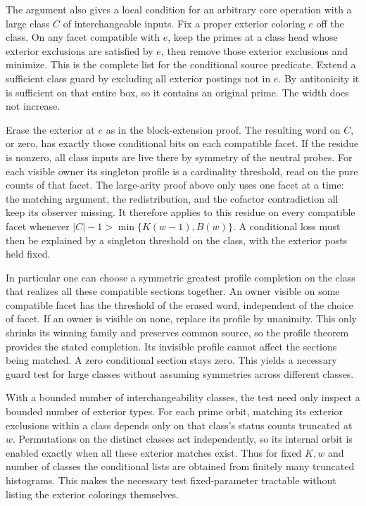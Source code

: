 The argument also gives a local condition for an arbitrary
core operation with a large class $C$ of interchangeable
inputs. Fix a proper exterior coloring $e$ off the class.
On any facet compatible with $e$, keep the primes at a class
head whose exterior exclusions are satisfied by $e$, then
remove those exterior exclusions and minimize. This is the
complete list for the conditional source predicate. Extend a
sufficient class guard by excluding all exterior postings not
in $e$. By antitonicity it is sufficient on that entire box,
so it contains an original prime. The width does not increase.

Erase the exterior at $e$ as in the block-extension proof.
The resulting word on $C$, or zero, has exactly those
conditional bits on each compatible facet. If the residue
is nonzero, all class inputs are live there by symmetry of
the neutral probes. For each visible owner its singleton
profile is a cardinality threshold, read on the pure counts
of that facet. The large-arity proof above only uses one
facet at a time: the matching argument, the redistribution,
and the cofactor contradiction all keep its observer missing.
It therefore applies to this residue on every compatible
facet whenever $|C|-1>\min\{K(w-1),B(w)\}$. A conditional
loss must then be explained by a singleton threshold on the
class, with the exterior posts held fixed.

In particular one can choose a symmetric greatest profile
completion on the class that realizes all these compatible
sections together. An owner visible on some compatible facet
has the threshold of the erased word, independent of the
choice of facet. If an owner is visible on none, replace its
profile by unanimity. This only shrinks its winning family
and preserves common source, so the profile theorem provides
the stated completion. Its invisible profile cannot affect
the sections being matched. A zero conditional section stays
zero. This yields a necessary guard test for large classes
without assuming symmetries across different classes.

With a bounded number of interchangeability classes, the
test need only inspect a bounded number of exterior types.
For each prime orbit, matching its exterior exclusions
within a class depends only on that class's status counts
truncated at $w$. Permutations on the distinct classes act
independently, so its internal orbit is enabled exactly when
all these exterior matches exist. Thus for fixed $K,w$ and
number of classes the conditional lists are obtained from
finitely many truncated histograms. This makes the necessary
test fixed-parameter tractable without listing the exterior
colorings themselves.

